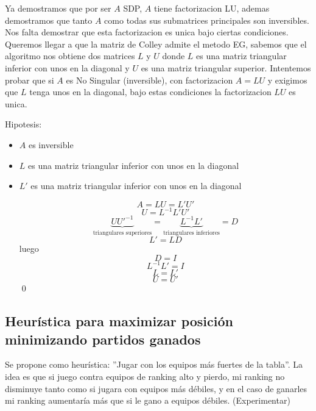 Ya demostramos que por ser $A$ SDP, $A$ tiene factorizacion LU, ademas demostramos que tanto $A$ como todas sus submatrices principales son inversibles. Nos falta demostrar que esta factorizacion es unica bajo ciertas condiciones.
Queremos llegar a que la matriz de Colley admite el metodo EG, sabemos que el algoritmo nos obtiene dos matrices $L$ y $U$ donde $L$ es una matriz triangular inferior con unos en la diagonal y $U$ es una matriz triangular superior.
Intentemos probar que si $A$ es No Singular (inversible), con factorizacion $A = LU$ y exigimos que $L$ tenga unos en la diagonal, bajo estas condiciones la factorizacion $LU$ es unica.

Hipotesis:
\begin{itemize}

	\item $A$ es inversible
	\item $L$ es una matriz triangular inferior con unos en la diagonal
	\item $L'$ es una matriz triangular inferior con unos en la diagonal
	
	\[ A = LU = L'U' \]
	\[U = L^{-1} L' U' \]
	\[ \underbrace{U U'^{-1}}_{\text{triangulares superiores}} = \underbrace{L^{-1} L'}_{\text{triangulares inferiores}} = D \]
	\[ L' = L D \]
	luego 
	\[ D = I \]
	\[ L^{-1} L' = I \]
	\[ L = L'\]
	\[ U = U' \]
\qed
\end{itemize}





\subsection{Heurística para maximizar posición minimizando partidos ganados}

Se propone como heurística: ''Jugar con los equipos más fuertes de la tabla''. La idea es que si juego contra equipos de ranking alto y pierdo, mi ranking no disminuye tanto como si jugara con equipos más débiles, y en el caso de ganarles mi ranking aumentaría más que si le gano a equipos débiles. (Experimentar)
